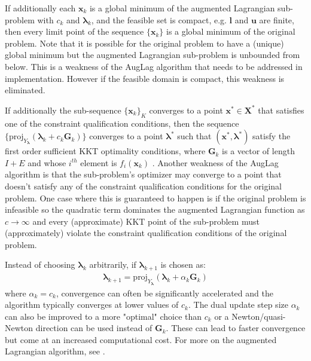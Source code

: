   If additionally each $\bm{x}_k$ is a global minimum of the augmented Lagrangian sub-problem with $c_k$ and $\bm{\lambda}_k$, and the feasible set is compact, e.g. $\bm{l}$ and $\bm{u}$ are finite, then every limit point of the sequence $\{ \bm{x}_k \}$ is a global minimum of the original problem. Note that it is possible for the original problem to have a (unique) global minimum but the augmented Lagrangian sub-problem is unbounded from below. This is a weakness of the AugLag algorithm that needs to be addressed in implementation. However if the feasible domain is compact, this weakness is eliminated.
  
  If additionally the sub-sequence $\{ \bm{x}_k \}_K$ converges to a point $\bm{x}^* \in \bm{X}^*$ that satisfies one of the constraint qualification conditions, then the sequence $\{ \text{proj}_{Y_{\bm{\lambda}}} (\bm{\lambda}_k + c_k \bm{G}_k) \}$ converges to a point $\bm{\lambda}^*$ such that $(\bm{x}^*, \bm{\lambda}^*)$ satisfy the first order sufficient KKT optimality conditions, where $\bm{G}_k$ is a vector of length $I + E$ and whose $i^{th}$ element is $f_i(\bm{x}_k)$ \citep{Bertsekas1996}. Another weakness of the AugLag algorithm is that the sub-problem's optimizer may converge to a point that doesn't satisfy any of the constraint qualification conditions for the original problem. One case where this is guaranteed to happen is if the original problem is infeasible so the quadratic term dominates the augmented Lagrangian function as $c \to \infty$ and every (approximate) KKT point of the sub-problem must (approximately) violate the constraint qualification conditions of the original problem.
  
  Instead of choosing $\bm{\lambda}_k$ arbitrarily, if $\bm{\lambda}_{k+1}$ is chosen as:
  \begin{align}
      \bm{\lambda}_{k+1} = \text{proj}_{Y_{\bm{\lambda}}} (\bm{\lambda}_k + \alpha_k \bm{G}_k)
  \end{align}
  where $\alpha_k = c_k$, convergence can often be significantly accelerated and the algorithm typically converges at lower values of $c_k$. The dual update step size $\alpha_k$ can also be improved to a more "optimal" choice than $c_k$ or a Newton/quasi-Newton direction can be used instead of $\bm{G}_k$. These can lead to faster convergence but come at an increased computational cost. For more on the augmented Lagrangian algorithm, see \cite{Bertsekas1996}.
  
